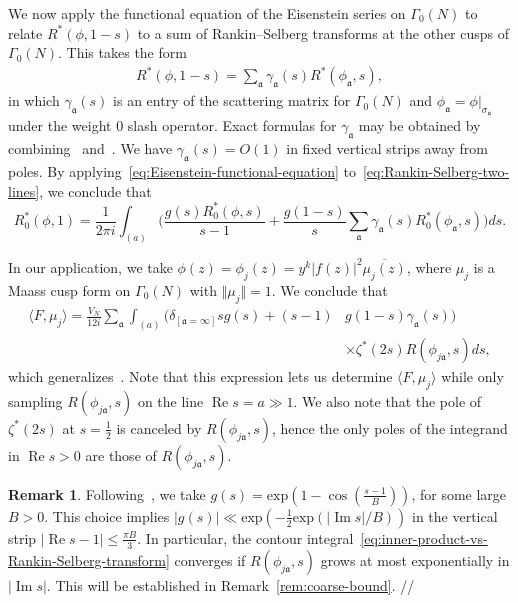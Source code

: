 \documentclass[11pt,reqno]{amsart}
\theoremstyle{plain}
\theoremstyle{definition}
\newtheorem{remark}[theorem]{Remark}
\numberwithin{equation}{section}
\renewcommand{\Im}{\operatorname{Im}}
\renewcommand{\Re}{\operatorname{Re}}
\begin{document}
We now apply the functional equation of the Eisenstein series on $\Gamma_0(N)$ to relate $R^*(\phi, 1-s)$ to a sum of Rankin--Selberg transforms at the other cusps of $\Gamma_0(N)$. This takes the form
\begin{align} \label{eq:Eisenstein-functional-equation}
	R^*(\phi, 1-s ) = \sum_\mathfrak{a} \gamma_{\mathfrak{a}}(s)  R^*(\phi_\mathfrak{a}, s),
\end{align}
in which $\gamma_\mathfrak{a}(s)$ is an entry of the scattering matrix for $\Gamma_0(N)$ and $\phi_\mathfrak{a} = \phi\vert_{\sigma_{\mathfrak{a}}}$ under the weight $0$ slash operator. Exact formulas for $\gamma_\mathfrak{a}$ may be obtained by combining~\cite[Theorem 6.1]{Young19} and~\cite[Proposition 4.2]{Young19}. We have $\gamma_\mathfrak{a}(s) = O(1)$ in fixed vertical strips away from poles. By applying~\eqref{eq:Eisenstein-functional-equation} to~\eqref{eq:Rankin-Selberg-two-lines}, we conclude that
\[
	R_0^*(\phi, 1)
	= \frac{1}{2\pi i} \int_{(a)} \Big(\frac{g(s) R_0^*(\phi, s)}{s-1} 
			+ \frac{g(1-s)}{s} \sum_\mathfrak{a} \gamma_\mathfrak{a}(s)  R_0^*(\phi_\mathfrak{a}, s) \Big) ds.
\]

In our application, we take $\phi(z) = \phi_j(z) = y^k \vert f(z) \vert^2 \overline{\mu_j(z)}$, where $\mu_j$ is a Maass cusp form on $\Gamma_0(N)$ with $\Vert \mu_j \Vert = 1$. We conclude that
\begin{align} \label{eq:inner-product-vs-Rankin-Selberg-transform}
	\langle F, \mu_j \rangle
		= \frac{V_N}{12 i} \sum_\mathfrak{a}  \int_{(a)} 
			\Big( \delta_{[\mathfrak{a}=\infty]}s g(s) + (s-1) & g(1-s) \gamma_\mathfrak{a}(s)\Big) \\
				& \times \zeta^*(2s) R(\phi_{j\mathfrak{a}}, s) ds,
\end{align}
which generalizes~\cite[(2.10)]{Jutila96}. Note that this expression lets us determine $\langle F, \mu_j \rangle$ while only sampling $R(\phi_{j\mathfrak{a}},s)$ on the line $\Re s = a \gg 1$. We also note that the pole of $\zeta^*(2s)$ at $s= \frac{1}{2}$ is canceled by $R(\phi_{j\mathfrak{a}},s)$, hence the only poles of the integrand in $\Re s > 0$ are those of $R(\phi_{j\mathfrak{a}},s)$.

\begin{remark}
Following~\cite[(2.8)]{Jutila96}, we take $g(s) = \mathrm{exp}(1- \cos(\frac{s-1}{B}))$, for some large $B>0$. This choice implies $\vert g(s) \vert \ll \mathrm{exp}(-\frac{1}{2} \mathrm{exp}(\vert \Im s \vert / B))$ in the vertical strip $\vert \Re s - 1 \vert \leq \frac{\pi B}{3}$. In particular, the contour integral~\eqref{eq:inner-product-vs-Rankin-Selberg-transform} converges if $R(\phi_{j\mathfrak{a}},s)$ grows at most exponentially in $\vert \Im s \vert$. This will be established in Remark~\ref{rem:coarse-bound}. \hfill //
\end{remark}
\end{document}

